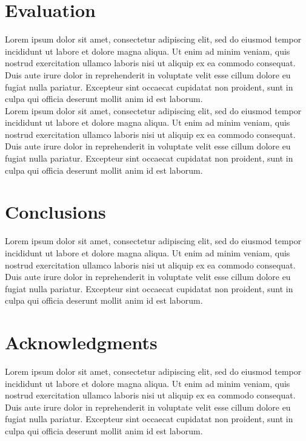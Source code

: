 \documentclass{sig-alternate-05-2015}
\begin{document}
\section{Evaluation}
Lorem ipsum dolor sit amet, consectetur adipiscing elit, sed do eiusmod tempor incididunt ut labore et dolore magna aliqua.
Ut enim ad minim veniam, quis nostrud exercitation ullamco laboris nisi ut aliquip ex ea commodo consequat.
Duis aute irure dolor in reprehenderit in voluptate velit esse cillum dolore eu fugiat nulla pariatur.
Excepteur sint occaecat cupidatat non proident, sunt in culpa qui officia deserunt mollit anim id est laborum.
\\
Lorem ipsum dolor sit amet, consectetur adipiscing elit, sed do eiusmod tempor incididunt ut labore et dolore magna aliqua.
Ut enim ad minim veniam, quis nostrud exercitation ullamco laboris nisi ut aliquip ex ea commodo consequat.
Duis aute irure dolor in reprehenderit in voluptate velit esse cillum dolore eu fugiat nulla pariatur.
Excepteur sint occaecat cupidatat non proident, sunt in culpa qui officia deserunt mollit anim id est laborum.

\section{Conclusions}
Lorem ipsum dolor sit amet, consectetur adipiscing elit, sed do eiusmod tempor incididunt ut labore et dolore magna aliqua.
Ut enim ad minim veniam, quis nostrud exercitation ullamco laboris nisi ut aliquip ex ea commodo consequat.
Duis aute irure dolor in reprehenderit in voluptate velit esse cillum dolore eu fugiat nulla pariatur.
Excepteur sint occaecat cupidatat non proident, sunt in culpa qui officia deserunt mollit anim id est laborum.

\section{Acknowledgments}
Lorem ipsum dolor sit amet, consectetur adipiscing elit, sed do eiusmod tempor incididunt ut labore et dolore magna aliqua.
Ut enim ad minim veniam, quis nostrud exercitation ullamco laboris nisi ut aliquip ex ea commodo consequat.
Duis aute irure dolor in reprehenderit in voluptate velit esse cillum dolore eu fugiat nulla pariatur.
Excepteur sint occaecat cupidatat non proident, sunt in culpa qui officia deserunt mollit anim id est laborum.




\end{document}
